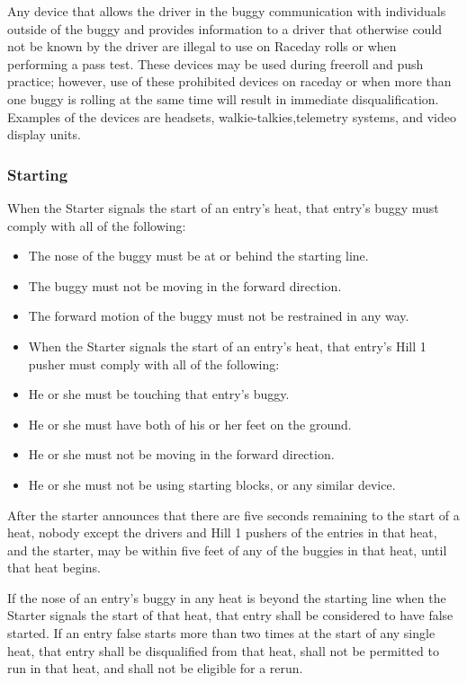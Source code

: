 Any device that allows the driver in the buggy communication with individuals outside of the buggy and provides information to a driver that otherwise could not be known by the driver are illegal to use on Raceday rolls or when performing a pass test. These devices may be used during freeroll and push practice; however, use of these prohibited devices on raceday or when more than one buggy is rolling at the same time will result in immediate disqualification. Examples of the devices are headsets, walkie-talkies,telemetry systems, and video display units.

\subsubsection{Starting}

When the Starter signals the start of an entry's heat, that entry's buggy must comply with all of the following:
\begin{itemize}
	\item The nose of the buggy must be at or behind the starting line.
	\item The buggy must not be moving in the forward direction.
	\item The forward motion of the buggy must not be restrained in any way.
	\item When the Starter signals the start of an entry's heat, that entry's Hill 1 pusher must comply with all of the following:
	\item He or she must be touching that entry's buggy.
	\item He or she must have both of his or her feet on the ground.
	\item He or she must not be moving in the forward direction.
	\item He or she must not be using starting blocks, or any similar device.
\end{itemize}

After the starter announces that there are five seconds remaining to the start of a heat, nobody except the drivers and Hill 1 pushers of the entries in that heat, and the starter, may be within five feet of any of the buggies in that heat, until that heat begins.

If the nose of an entry's buggy in any heat is beyond the starting line when the Starter signals the start of that heat, that entry shall be considered to have false started. If an entry false starts more than two times at the start of any single heat, that entry shall be disqualified from that heat, shall not be permitted to run in that heat, and shall not be eligible for a rerun.

